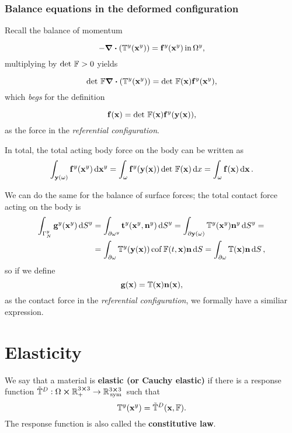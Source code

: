 \documentclass[reqno, a4paper]{article}
\begin{document}
\subsubsection{Balance equations in the deformed configuration}
\label{sec:balance_equations_piola}
Recall the balance of momentum

\begin{equation*}
    -\divergence{\qty(\cstress\qty(\vb{x}^{y}))}=\vb{f}^{y}\qty(\vb{x}^{y}) \, \text{in} \, \Omega^{y},
\end{equation*}
multiplying by $\det\, \mathbb{F} >0$ yields

\begin{equation}
    \detf \divergence{\qty(\cstress\qty(\vb{x}^{y}))} = \detf \qty(\vb{x}) \vb{f}^{y}\qty(\vb{x}^{y}),
\end{equation}
which \textit{begs} for the definition

\begin{equation*}
    \vb{f}\qty(\vb{x})= \det\, \mathbb{F} \qty(\vb{x}) \vb{f}^{y}\qty(\vb{y}\qty(\vb{x})),
\end{equation*}
as the force in the \textit{referential configuration}.

In total, the total acting body force on the body can be written as
\[
	\int_{\vb{y}\qty(\omega)}\vb{f}^{y}\qty(\vb{x}^{y})\dd{\vb{x}^{y}} = \int_{\omega}\vb{f}^{y}\qty(\vb{y}\qty(\vb{x}))\det\, \mathbb{F} \qty(\vb{x})\dd{x} = \int_{\omega}\vb{f}\qty(\vb{x})\dd{\vb{x}}.
\]

We can do the same for the balance of surface forces; the total contact force acting on the body is
\begin{align*}
	\int_{\Gamma_N^{y}}\vb{g}^{y}\qty(\vb{x}^{y})\dd{S}^{y} &=\int_{\partial \omega^{y}}\vb{t}^{y}\qty(\vb{x}^{y},\vb{n}^{y})\dd{S}^{y} = \int_{\partial \vb{y}\qty(\omega)}\mathbb{T}^y\qty(\vb{x}^{y})\vb{n}^{y}\dd{S}^{y}=\\
								&=\int_{\partial \omega}\mathbb{T}^y(\vb{y}(\vb{x}))\operatorname{cof} \mathbb{F}(t,\vb{x}) \vb{n}\dd{S} = \int_{\partial \omega}\mathbb{T}\qty(\vb{x})\vb{n}\dd{S},
\end{align*}
so if we define
\[
	\vb{g}(\vb{x}) = \mathbb{T}\qty(\vb{x})\vb{n}\qty(\vb{x}),
\]
as the contact force in the \textit{referential configuration}, we formally have a similiar expression.

\section{Elasticity}
\label{sec:elasticity}

\begin{definition}[Elasticity]
We say that a material is \textbf{elastic (or Cauchy elastic)} if there is a response function $\tilde{\mathbb{T}}^D:\Omega \cross {\mathbb R}^{3 \cross 3}_+ \to {\mathbb R}^{3 \cross 3}_{\, \text{sym} \,}$ such that
\[
	\mathbb{T}^y\qty(\vb{x}^{y})= \tilde{\mathbb{T}}^D\qty(\vb{x},\mathbb{F}).
\]
The response function is also called the \textbf{constitutive law}.
\end{definition}
\end{document}
